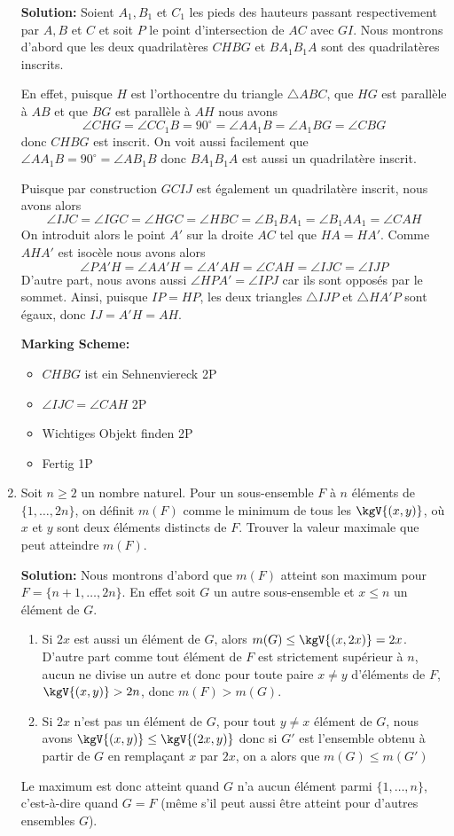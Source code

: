 \documentclass[language=german,style=solution]{smo}
\begin{document}
\begin{enumerate}[label=\textbf{\arabic*.}]
\textbf{Solution:}
Soient $A_1,B_1$ et $C_1$ les pieds des hauteurs passant respectivement par $A,B$ et $C$ et soit $P$ le point d'intersection de $AC$ avec $GI$. Nous montrons d'abord que les deux quadrilatères $CHBG$ et $BA_1B_1A$ sont des quadrilatères inscrits.
	
En effet, puisque $H$ est l'orthocentre du triangle $\triangle ABC$, que $HG$ est parallèle à $AB$ et que $BG$ est parallèle à $AH$ nous avons 
\[
\angle CHG = \angle CC_1B = 90^{\circ} = \angle AA_1B = \angle A_1BG = \angle CBG
\]
donc $CHBG$ est inscrit. On voit aussi facilement que $\angle AA_1B = 90^{\circ} = \angle AB_1B$ donc $BA_1B_1A$ est aussi un quadrilatère inscrit. 
	
Puisque par construction $GCIJ$ est également un quadrilatère inscrit, nous avons alors 
\[
\angle IJC = \angle IGC = \angle HGC = \angle HBC = \angle B_1BA_1 = \angle B_1AA_1 = \angle CAH
\]
On introduit alors le point $A'$ sur la droite $AC$ tel que $HA = HA'$. Comme $AHA'$ est isocèle nous avons alors 
\[
\angle PA'H = \angle AA'H = \angle A'AH = \angle CAH = \angle IJC = \angle IJP
\]
D'autre part, nous avons aussi $\angle HPA' = \angle IPJ$ car ils sont opposés par le sommet. Ainsi, puisque $IP = HP$, les deux triangles $\triangle IJP$ et $\triangle HA'P$ sont égaux, donc $IJ = A'H = AH$.

\textbf{Marking Scheme:}
\begin{itemize}
\item $CHBG$ ist ein Sehnenviereck 2P
\item $\angle IJC=\angle CAH$ 2P
\item Wichtiges Objekt finden 2P
\item Fertig	 1P
\end{itemize}

\newpage

\item Soit $n \geq 2$ un nombre naturel. Pour un sous-ensemble $F$ à $n$ éléments de $\{1, \ldots, 2n\}$, on définit $m(F)$ comme le minimum de tous les $\kgV{(x,y)}$, où $x$ et $y$ sont deux éléments distincts de $F$. Trouver la valeur maximale que peut atteindre $m(F)$.

\textbf{Solution:} Nous montrons d'abord que $m(F)$ atteint son maximum pour $F = \{n+1, \ldots, 2n\}$. En effet soit $G$ un autre sous-ensemble et $x \leq n$ un élément de $G$.
\begin{enumerate}
\item Si $2x$ est aussi un élément de $G$, alors $m(G) \leq \kgV{(x, 2x)} = 2x$. D'autre part comme tout élément de $F$ est strictement supérieur à $n$, aucun ne divise un autre et donc pour toute paire $x\neq y$ d'éléments de $F$, $\kgV{(x, y)} > 2n$, donc $m(F) > m(G)$.
\item Si $2x$ n'est pas un élément de $G$, pour tout $y\neq x$ élément de $G$, nous avons $\kgV{(x, y)} \leq \kgV{(2x, y)}$ donc si $G'$ est l'ensemble obtenu à partir de $G$ en remplaçant $x$ par $2x$, on a alors que $m(G) \leq m(G')$
\end{enumerate}
Le maximum est donc atteint quand $G$ n'a aucun élément parmi $\{1,\ldots, n\}$, c'est-à-dire quand $G = F$ (même s'il peut aussi être atteint pour d'autres ensembles $G$).
			

\end{enumerate}
\end{document}
